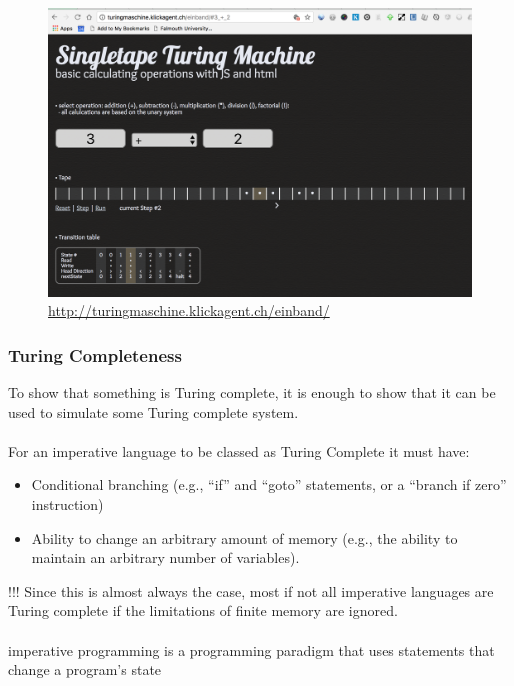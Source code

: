 \begin{frame}
	\begin{figure}
		\includegraphics[scale=0.2]{assets/interactive.png}
		\caption{\href{http://turingmaschine.klickagent.ch/einband/}{http://turingmaschine.klickagent.ch/einband/}}
	\end{figure}
\end{frame}

\begin{frame}
	\frametitle{Turing Completeness}
	
	To show that something is Turing complete, it is enough to show that it can be used to simulate some Turing complete system. 	\\ ~ \\
	For an imperative language to be classed as Turing Complete it must have:

	\begin{itemize}
		\item Conditional branching (e.g., ``if'' and ``goto'' statements, or a ``branch if zero'' instruction)
		\item Ability to change an arbitrary amount of memory (e.g., the ability to maintain an arbitrary number of variables).
	\end{itemize}
\end{frame}

\begin{frame}
	!!! Since this is almost always the case, most if not all imperative languages are Turing complete if the limitations of finite memory are ignored. \\~\\
	\tiny{imperative programming is a programming paradigm that uses statements that change a program's state}
	
\end{frame}



